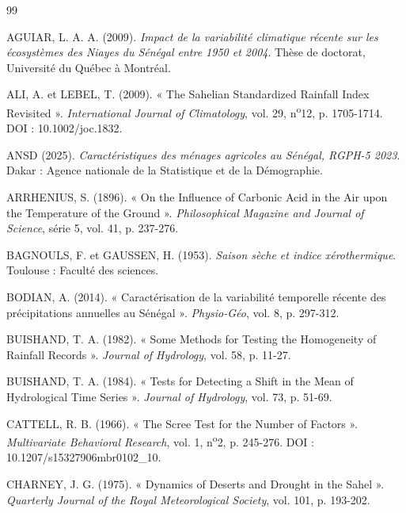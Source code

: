 \documentclass[12pt,a4paper]{report}
\begin{document}
\renewcommand{\bibname}{RÉFÉRENCES BIBLIOGRAPHIQUES}
\makeatletter
\renewcommand{\@biblabel}[1]{\makebox[2.2em][l]{[#1]}}
\makeatother
\begin{thebibliography}{99}
\thispagestyle{fancy}
AGUIAR, L. A. A. (2009). \textit{Impact de la variabilité climatique récente sur les écosystèmes des Niayes du Sénégal entre 1950 et 2004}. Thèse de doctorat, Université du Québec à Montréal.

ALI, A. et LEBEL, T. (2009). « The Sahelian Standardized Rainfall Index Revisited ». \textit{International Journal of Climatology}, vol. 29, n\textsuperscript{o}12, p. 1705-1714. DOI : 10.1002/joc.1832.

ANSD (2025). \textit{Caractéristiques des ménages agricoles au Sénégal, RGPH-5 2023}. Dakar : Agence nationale de la Statistique et de la Démographie.

ARRHENIUS, S. (1896). « On the Influence of Carbonic Acid in the Air upon the Temperature of the Ground ». \textit{Philosophical Magazine and Journal of Science}, série 5, vol. 41, p. 237-276.

BAGNOULS, F. et GAUSSEN, H. (1953). \textit{Saison sèche et indice xérothermique}. Toulouse : Faculté des sciences.

BODIAN, A. (2014). « Caractérisation de la variabilité temporelle récente des précipitations annuelles au Sénégal ». \textit{Physio-Géo}, vol. 8, p. 297-312.

BUISHAND, T. A. (1982). « Some Methods for Testing the Homogeneity of Rainfall Records ». \textit{Journal of Hydrology}, vol. 58, p. 11-27.

BUISHAND, T. A. (1984). « Tests for Detecting a Shift in the Mean of Hydrological Time Series ». \textit{Journal of Hydrology}, vol. 73, p. 51-69.

CATTELL, R. B. (1966). « The Scree Test for the Number of Factors ». \textit{Multivariate Behavioral Research}, vol. 1, n\textsuperscript{o}2, p. 245-276. DOI : 10.1207/s15327906mbr0102\_10.

CHARNEY, J. G. (1975). « Dynamics of Deserts and Drought in the Sahel ». \textit{Quarterly Journal of the Royal Meteorological Society}, vol. 101, p. 193-202.


\end{thebibliography}
\end{document}
